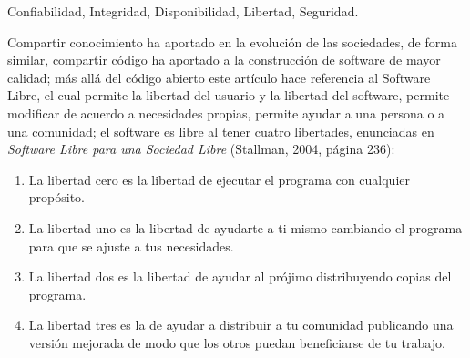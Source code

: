 \begin{multicols}{2}




 Confiabilidad, Integridad, Disponibilidad, Libertad, Seguridad.\\
\vspace{0.3cm}


Compartir conocimiento ha aportado en la evolución de las sociedades, de forma similar, compartir código ha aportado a la construcción de software de mayor calidad; más allá del código abierto este artículo hace referencia al Software Libre, el cual permite la libertad del usuario y la libertad del software, permite modificar de acuerdo a necesidades propias, permite ayudar a una persona o a una comunidad; el software es libre al tener cuatro libertades, enunciadas en \textit{Software Libre para una Sociedad Libre} (Stallman, 2004, página 236): 

\vspace{0.1cm}

\begin{enumerate}
	\item[0.] La libertad cero es la libertad de ejecutar el programa con cualquier propósito. 
	\item[1.] La libertad uno es la libertad de ayudarte a ti mismo cambiando el programa para que se ajuste a tus necesidades. 
    \item[2.] La libertad dos es la libertad de ayudar al prójimo distribuyendo copias del programa. 
    \item[3.] La libertad tres es la de ayudar a distribuir a tu comunidad publicando una versión mejorada de modo que los otros puedan beneficiarse de tu trabajo.
\end{enumerate}


\end{multicols}
